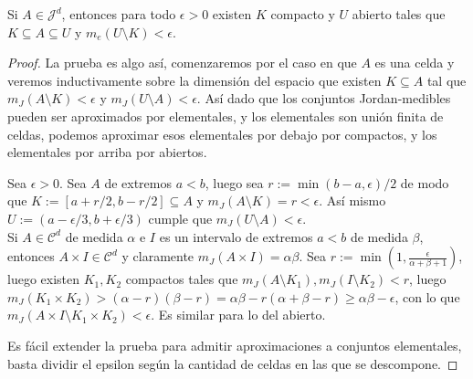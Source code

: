 \begin{prop}
	Si $A\in\mathcal{J}^d$, entonces para todo $\epsilon > 0$ existen $K$ compacto y $U$ abierto tales que $K\subseteq A\subseteq U$ y $m_e(U\setminus K) < \epsilon$.
\end{prop}
\begin{proof}
	La prueba es algo así, comenzaremos por el caso en que $A$ es una celda y veremos inductivamente sobre la dimensión del espacio que existen $K\subseteq A$ tal que $m_J(A\setminus K) < \epsilon$ y $m_J(U\setminus A) < \epsilon$. Así dado que los conjuntos Jordan-medibles pueden ser aproximados por elementales, y los elementales son unión finita de celdas, podemos aproximar esos elementales por debajo por compactos, y los elementales por arriba por abiertos.
	\par
	Sea $\epsilon > 0$. Sea $A$ de extremos $a<b$, luego sea $r := \min(b-a, \epsilon)/2$ de modo que $K := [ a+r/2, b-r/2 ] \subseteq A$ y $m_J(A\setminus K) = r < \epsilon$. Así mismo $U := (a - \epsilon/3, b + \epsilon/3)$ cumple que $m_J(U\setminus A) < \epsilon$.
	\\
	Si $A \in \mathcal{C}^d$ de medida $\alpha$ e $I$ es un intervalo de extremos $a<b$ de medida $\beta$, entonces $A\times I\in \mathcal{C}^d$ y claramente $m_J(A\times I) = \alpha\beta$. Sea $r := \min\left( 1, \frac{\epsilon}{\alpha + \beta + 1} \right)$, luego existen $K_1,K_2$ compactos tales que $m_J(A\setminus K_1), m_J(I\setminus K_2) < r$, luego $m_J(K_1\times K_2) > (\alpha-r)(\beta-r) = \alpha\beta - r(\alpha + \beta - r) \ge \alpha\beta - \epsilon$, con lo que $m_J(A\times I\setminus K_1\times K_2) < \epsilon$.
	Es similar para lo del abierto.
	\par
	Es fácil extender la prueba para admitir aproximaciones a conjuntos elementales, basta dividir el epsilon según la cantidad de celdas en las que se descompone.
\end{proof}

